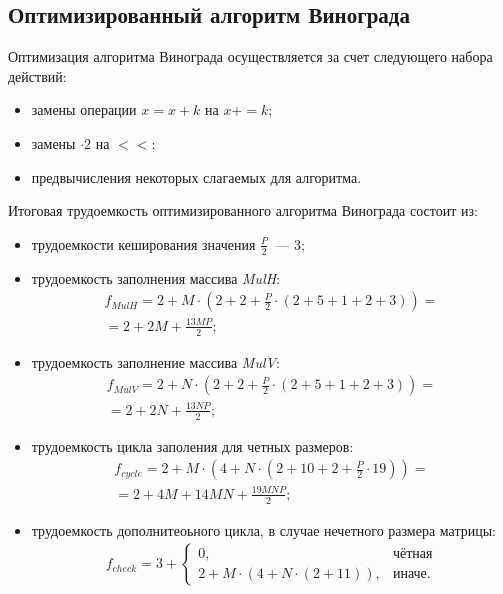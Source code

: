 \subsection*{Оптимизированный алгоритм Винограда}
Оптимизация алгоритма Винограда осуществляется за счет следующего набора действий:
\begin{itemize}
	\item замены операции $x = x + k$ на $x += k$;
	\item замены $\cdot 2$ на $<<$;
	\item предвычисления некоторых слагаемых для алгоритма.
\end{itemize}
Итоговая трудоемкость оптимизированного алгоритма Винограда состоит из:
\begin{itemize}
	\item трудоемкости кеширования значения $\frac{P}{2}$~--- 3;
	\item трудоемкость заполнения массива \textit{MulH}:
	\begin{equation}
		\begin{gathered}
			f_{MulH} = 2 + M \cdot (2 + 2 + \frac{P}{2} \cdot (2 + 5 + 1 + 2 + 3)) = \\
			= 2 + 2M + \frac{13MP}{2};
		\end{gathered}
	\end{equation}
	\item трудоемкость заполнение массива \textit{MulV}:
	\begin{equation}
		\begin{gathered}
			f_{MulV} = 2 + N \cdot (2 + 2 + \frac{P}{2} \cdot (2 + 5 + 1 + 2 + 3)) = \\
			= 2 + 2N + \frac{13NP}{2};
		\end{gathered}
	\end{equation}
	\item трудоемкость цикла заполения для четных размеров:
	\begin{equation}
		\begin{gathered}
			f_{cycle} = 2 + M \cdot (4 + N \cdot (2 + 10 + 2 + \frac{P}{2} \cdot 19)) = \\
			= 2 + 4M + 14MN + \frac{19MNP}{2};
		\end{gathered}
	\end{equation}
	\item трудоемкость дополнитеоьного цикла, в случае нечетного размера матрицы:
	\begin{equation}
		\begin{gathered}
			f_{check} = 3 + 
			\begin{cases}
				0, & \text{чётная} \\
				2 + M \cdot (4 + N \cdot (2 + 11)), & \text{иначе}.
			\end{cases}
		\end{gathered}  
	\end{equation}
\end{itemize}
